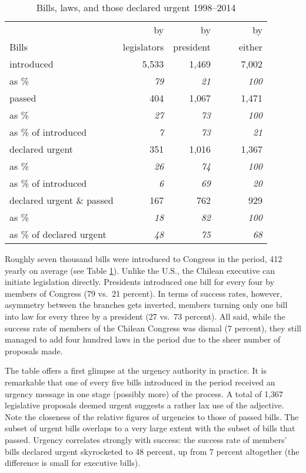 \documentclass[letter,12pt]{article}
\begin{document}
\begin{table}
\centering
\begin{tabular}{lrrr}
                         &  by           &  by          &    by      \\
Bills                    &  legislators  &  president   &    ~~~~either  \\ \hline
introduced               &        5,533  &       1,469  &     7,002  \\
as \%                    &    \emph{79}  &   \emph{21}  & \emph{100} \\ \hdashline
passed                   &          404  &       1,067  &     1,471  \\
as \%                    &    \emph{27}  &   \emph{73}  & \emph{100} \\
as \% of introduced      &     \emph{7}  &   \emph{73}  &  \emph{21} \\ \hdashline
declared urgent          &          351  &       1,016  &     1,367  \\
as \%                    &    \emph{26}  &   \emph{74}  & \emph{100} \\
as \% of introduced      &     \emph{6}  &   \emph{69}  &  \emph{20} \\ \hdashline
declared urgent \& passed&          167  &         762  &       929  \\
as \%                    &    \emph{18}  &   \emph{82}  & \emph{100} \\
as \% of declared urgent &    \emph{48}  &   \emph{75}  &  \emph{68} \\ \hline
\end{tabular}
\caption{Bills, laws, and those declared urgent 1998--2014}\label{T:billDescriptives}
\end{table}

Roughly seven thousand bills were introduced to Congress in the period, 412 yearly on average (see Table \ref{T:billDescriptives}). Unlike the U.S., the Chilean executive can initiate legislation directly. Presidents introduced one bill for every four by members of Congress (79 vs.\ 21 percent). In terms of success rates, however, asymmetry between the branches gets inverted, members turning only one bill into law for every three by a president (27 vs.\ 73 percent). All said, while the success rate of members of the Chilean Congress was dismal (7 percent), they still managed to add four hundred laws in the period due to the sheer number of proposals made. 

The table offers a first glimpse at the urgency authority in practice. It is remarkable that one of every five bills introduced in the period received an urgency message in one stage (possibly more) of the process. A total of 1,367 legislative proposals deemed urgent suggests a rather lax use of the adjective. Note the closeness of the relative figures of urgencies to those of passed bills. The subset of urgent bills overlaps to a very large extent with the subset of bills that passed. Urgency correlates strongly with success: the success rate of members' bills declared urgent skyrocketed to 48 percent, up from 7 percent altogether (the difference is small for executive bills). 
\end{document}
